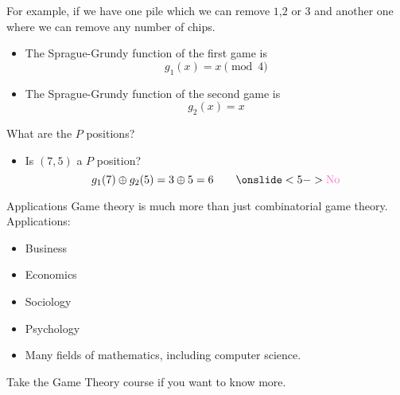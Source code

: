 \documentclass[12pt,t]{beamer}
\newcommand{\bi}{\begin{itemize}}
\newcommand{\ei}{\end{itemize}}
\begin{document}
\begin{frame}
  \vspace{15pt}
  For example, if we have one pile which we can remove $1$,$2$ or $3$ and
  another one where we can remove any number of chips.
  \bi
\item The Sprague-Grundy function of the first game is \[g_1(x) = x \pmod{4}\]
    \item The Sprague-Grundy function of the second game is \[g_2(x) = x\]
  \ei
  What are the $P$ positions?
  \bi
    \item Is $(7,5)$ a $P$ position?
      \[
        g_1(7) \oplus g_2(5) = 3 \oplus 5 = 6 \quad\quad\onslide<5->{\color{vhilight}\text{No}}
      \]
  \ei
\end{frame}

\begin{frame}{Applications}
  \vspace{20pt}
  Game theory is much more than just combinatorial game theory. \\
  Applications:
  \bi
    \item Business
    \item Economics
    \item Sociology
    \item Psychology
    \item Many fields of mathematics, including computer science.
  \ei
  \vspace{10pt}
  Take the Game Theory course if you want to know more.
\end{frame}





\end{document}
